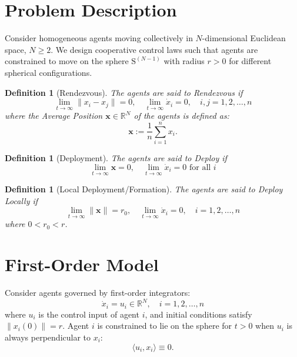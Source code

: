 \documentclass{article}
\newtheorem{definition}[theorem]{Definition}
\begin{document}
\section{Problem Description}

Consider homogeneous agents moving collectively in $N$-dimensional Euclidean space, $N \geq 2$. We design cooperative control laws such that agents are constrained to move on the sphere $\mathrm{S}^{(N-1)}$ with radius $r > 0$ for different spherical configurations.

\begin{definition}[Rendezvous]
The agents are said to \textit{Rendezvous} if
\begin{equation}
\lim_{t \to \infty} \|x_i - x_j\| = 0, \quad \lim_{t \to \infty} \dot{x}_i = 0, \quad i,j = 1,2,\dots,n
\end{equation}
where the \textit{Average Position} $\boldsymbol{x} \in \mathbb{R}^N$ of the agents is defined as:
\begin{equation}
\boldsymbol{x} := \frac{1}{n} \sum_{i=1}^n x_i.
\end{equation}
\end{definition}

\begin{definition}[Deployment]
The agents are said to \textit{Deploy} if
\begin{equation}
\lim_{t \to \infty} \boldsymbol{x} = 0, \quad \lim_{t \to \infty} \dot{x}_i = 0 \text{ for all } i
\end{equation}
\end{definition}

\begin{definition}[Local Deployment/Formation]
The agents are said to \textit{Deploy Locally} if
\begin{equation}
\lim_{t \to \infty} \|\boldsymbol{x}\| = r_0, \quad \lim_{t \to \infty} \dot{x}_i = 0, \quad i = 1,2,\dots,n
\end{equation}
where $0 < r_0 < r$.
\end{definition}

\section{First-Order Model}

Consider agents governed by first-order integrators:
\begin{equation}
\dot{x}_i = u_i \in \mathbb{R}^N, \quad i = 1,2,\dots,n
\end{equation}
where $u_i$ is the control input of agent $i$, and initial conditions satisfy $\|x_i(0)\| = r$. Agent $i$ is constrained to lie on the sphere for $t > 0$ when $u_i$ is always perpendicular to $x_i$:
\begin{equation}
\langle u_i, x_i \rangle \equiv 0.
\end{equation}
\end{document}
